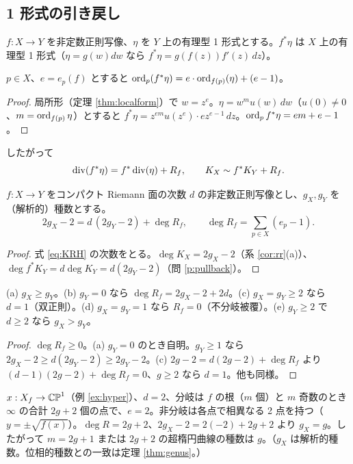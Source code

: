 \subsection{1 形式の引き戻し}
$f:X\to Y$ を非定数正則写像、$\eta$ を $Y$ 上の有理型 1 形式とする。$f^*\eta$ は $X$ 上の有理型 1 形式（$\eta=g(w)dw$ なら $f^*\eta=g(f(z))f'(z)\,dz$）。
\begin{lem}\label{lem:pullbackord}
$p\in X$、$e=e_p(f)$ とすると $\operatorname{ord}_p(f^*\eta)=e\cdot\operatorname{ord}_{f(p)}(\eta)+(e-1)$。
\end{lem}
\begin{proof}
局所形（定理 \ref{thm:localform}）で $w=z^e$。$\eta=w^m u(w)\,dw$（$u(0)\ne0$、$m=\operatorname{ord}_{f(p)}\eta$）とすると $f^*\eta=z^{em}u(z^e)\cdot ez^{e-1}\,dz$。$\operatorname{ord}_pf^*\eta=em+e-1$。
\end{proof}
したがって
\begin{equation}\label{eq:KRH}
\operatorname{div}(f^*\eta)=f^*\operatorname{div}(\eta)+R_f,\qquad K_X\sim f^*K_Y+R_f.
\end{equation}

\begin{thm}\label{thm:RH}
$f:X\to Y$ をコンパクト Riemann 面の次数 $d$ の非定数正則写像とし、$g_X,g_Y$ を（解析的）種数とする。
\[
2g_X-2=d\,(2g_Y-2)+\deg R_f,\qquad \deg R_f=\sum_{p\in X}(e_p-1).
\]
\end{thm}
\begin{proof}
式 \eqref{eq:KRH} の次数をとる。$\deg K_X=2g_X-2$（系 \ref{cor:rr}(a)）、$\deg f^*K_Y=d\deg K_Y=d(2g_Y-2)$（問 \ref{p:pullback}）。
\end{proof}
\begin{cor}\label{cor:RHcons}
(a) $g_X\ge g_Y$。(b) $g_Y=0$ なら $\deg R_f=2g_X-2+2d$。(c) $g_X=g_Y\ge2$ なら $d=1$（双正則）。(d) $g_X=g_Y=1$ なら $R_f=0$（不分岐被覆）。(e) $g_Y\ge2$ で $d\ge2$ なら $g_X>g_Y$。
\end{cor}
\begin{proof}
$\deg R_f\ge0$。(a) $g_Y=0$ のとき自明。$g_Y\ge1$ なら $2g_X-2\ge d(2g_Y-2)\ge2g_Y-2$。(c) $2g-2=d(2g-2)+\deg R_f$ より $(d-1)(2g-2)+\deg R_f=0$、$g\ge2$ なら $d=1$。他も同様。 
\end{proof}
\begin{ex}[超楕円曲線の種数]\label{ex:hypergenus}
$x:X_f\to\mathbb{CP}^1$（例 \ref{ex:hyper}）、$d=2$、分岐は $f$ の根（$m$ 個）と $m$ 奇数のとき $\infty$ の合計 $2g+2$ 個の点で、$e=2$。非分岐は各点で相異なる 2 点を持つ（$y=\pm\sqrt{f(x)}$）。$\deg R=2g+2$、$2g_X-2=2(-2)+2g+2$ より $g_X=g$。したがって $m=2g+1$ または $2g+2$ の超楕円曲線の種数は $g$。（$g_X$ は解析的種数。位相的種数との一致は定理 \ref{thm:genus}。）
\end{ex}

